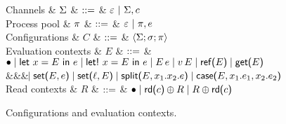 \begin{figure*}
\centering
\begin{grammar}
  Channels
  & $\Chans$ 
    & $\bnfas$ & $\emptyChans ~|~ \Chans, c$
    \\[2mm]
  Process pool
  & $\Procs$ 
    & $\bnfas$ & $\emptyProcs ~|~ \Procs, \proc{e}$
    \\[2mm]
  Configurations
  & $C$
     & $\bnfas$ & $\Config{\Chans}{\Store}{\Procs} $
     \\[2mm]
 Evaluation contexts
  & $E$
     & $\bnfas$ & $\bullet \bnfalt \eLet{x}{E}{e} \bnfalt \eLetBang{x}{E}{e} \bnfalt
 \eApp{E}{e} \bnfalt \eApp{v}{E} \bnfalt \eRef{E} \bnfalt \eGet{E}$
     \\ &&& $\bnfaltbrk \eSet{E}{e} \bnfalt \eSet{\ell}{E} \bnfalt
     \eSplit{E}{x_1}{x_2}{e} \bnfalt \eCase{E}{x_1}{e_1}{x_2}{e_2}$
\\[2mm]
 Read contexts
  & $R$
     & $\bnfas$ & $\bullet \bnfalt \eRd{\eChan{c}} \oplus R \bnfalt R \oplus \eRd{\eChan{c}}$
\end{grammar}
\caption{Configurations and evaluation contexts. }
\label{fig:configs}
\end{figure*}

